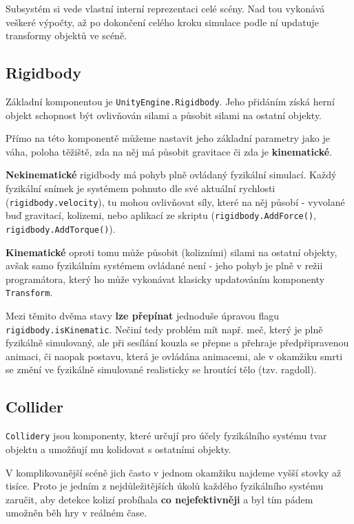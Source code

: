 Subsystém si vede vlastní interní reprezentaci celé scény. Nad tou vykonává veškeré výpočty, až po dokončení celého kroku simulace podle ní updatuje transformy objektů ve scéně. 

\subsection{Rigidbody}

Základní komponentou je \texttt{UnityEngine.Rigidbody}. Jeho přidáním získá herní objekt schopnost být ovlivňován silami a působit silami na ostatní objekty.

Přímo na této komponentě můžeme nastavit jeho základní parametry jako je váha, poloha těžiště, zda na něj má působit gravitace či zda je \textbf{kinematické}.

\textbf{Nekinematické} rigidbody má pohyb plně ovládaný fyzikální simulací. Každý fyzikální snímek je systémem pohnuto dle své aktuální rychlosti (\texttt{rigidbody.velocity}), tu mohou ovlivňovat síly, které na něj působí - vyvolané buď gravitací, kolizemi, nebo aplikací ze skriptu (\texttt{rigidbody.AddForce()}, \texttt{rigidbody.AddTorque()}).

\textbf{Kinematické} oproti tomu může působit (kolizními) silami na ostatní objekty, avšak samo fyzikálním systémem ovládané není - jeho pohyb je plně v režii programátora, který ho může vykonávat klasicky updatováním komponenty \texttt{Transform}.

Mezi těmito dvěma stavy \textbf{lze přepínat} jednoduše úpravou flagu \texttt{rigidbody.isKinematic}. Nečiní tedy problém mít např. meč, který je plně fyzikálně simulovaný, ale při sesílání kouzla se přepne a přehraje předpřipravenou animaci, či naopak postavu, která je ovládána animacemi, ale v okamžiku smrti se změní ve fyzikálně simulované realisticky se hroutící tělo (tzv. ragdoll).

\subsection{Collider} \label{collidersPhysicsIntroSubsection}

\texttt{Collidery} jsou komponenty, které určují pro účely fyzikálního systému tvar objektu a umožňují mu kolidovat s ostatními objekty. 

V komplikovanější scéně jich často v jednom okamžiku najdeme vyšší stovky až tisíce. Proto je jedním z nejdůležitějších úkolů každého fyzikálního systému zaručit, aby detekce kolizí probíhala \textbf{co nejefektivněji} a byl tím pádem umožněn běh hry v reálném čase.

